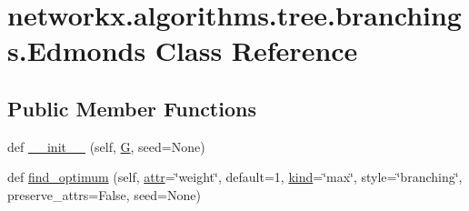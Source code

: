 \hypertarget{classnetworkx_1_1algorithms_1_1tree_1_1branchings_1_1Edmonds}{}\section{networkx.\+algorithms.\+tree.\+branchings.\+Edmonds Class Reference}
\label{classnetworkx_1_1algorithms_1_1tree_1_1branchings_1_1Edmonds}
\subsection*{Public Member Functions}
\begin{DoxyCompactItemize}
\item 
def \hyperlink{classnetworkx_1_1algorithms_1_1tree_1_1branchings_1_1Edmonds_a2bea3af594cf9b4945d02ddcd393d9a3}{\+\_\+\+\_\+init\+\_\+\+\_\+} (self, \hyperlink{classnetworkx_1_1algorithms_1_1tree_1_1branchings_1_1Edmonds_a9b2508114a6f8f778d0d1758650eda7e}{G}, seed=None)
\item 
def \hyperlink{classnetworkx_1_1algorithms_1_1tree_1_1branchings_1_1Edmonds_a4680246c685df6df9970a08a26408878}{find\+\_\+optimum} (self, \hyperlink{classnetworkx_1_1algorithms_1_1tree_1_1branchings_1_1Edmonds_a0c066fa3ee5d523fa4ecae69fe188c74}{attr}=\char`\"{}weight\char`\"{}, default=1, \hyperlink{classnetworkx_1_1algorithms_1_1tree_1_1branchings_1_1Edmonds_a0f7ebe7aed0795174669792be9077f82}{kind}=\char`\"{}max\char`\"{}, style=\char`\"{}branching\char`\"{}, preserve\+\_\+attrs=False, seed=None)
\end{DoxyCompactItemize}
